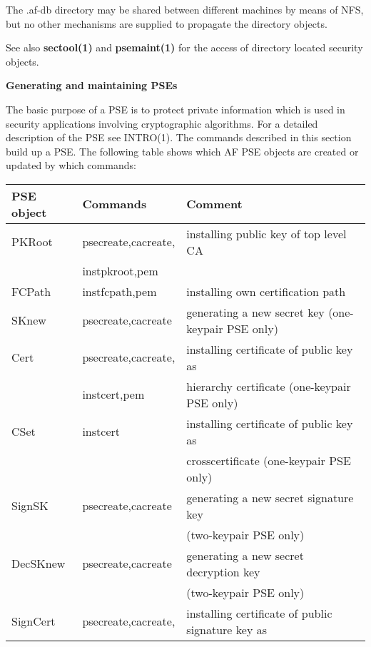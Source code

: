 The .af-db directory may be shared between different machines by means of NFS, but no other 
mechanisms are supplied to propagate the directory objects. 
 
See also {\bf sectool(1)} and {\bf psemaint(1)} for the access of directory located security objects.
 
{\bf Generating and maintaining PSEs}

The basic purpose of a PSE is to protect private information which is used
in security applications involving cryptographic algorithms. For a detailed 
description of the PSE see INTRO(1). The commands described in this
section build up a PSE. The following table shows which AF PSE objects are created or updated
by which commands:
{\small
\begin{tabular}{|l|l|l|} \hline 
PSE object   & Commands            & Comment                                             \\ \hline
PKRoot       & psecreate,cacreate, & installing public key of top level CA               \\
             & instpkroot,pem      &                                                     \\
FCPath       & instfcpath,pem      & installing own certification path                   \\
SKnew        & psecreate,cacreate  & generating a new secret key (one-keypair PSE only)  \\
Cert         & psecreate,cacreate, & installing certificate of public key as             \\
             & instcert,pem        & hierarchy certificate (one-keypair PSE only)        \\
CSet         & instcert            & installing certificate of public key as             \\
             &                     & crosscertificate (one-keypair PSE only)             \\
SignSK       & psecreate,cacreate  & generating a new secret signature key               \\
             &                     & (two-keypair PSE only)                              \\
DecSKnew     & psecreate,cacreate  & generating a new secret decryption key              \\
             &                     & (two-keypair PSE only)                              \\
SignCert     & psecreate,cacreate, & installing certificate of public signature key as   \\

\end{tabular}}

